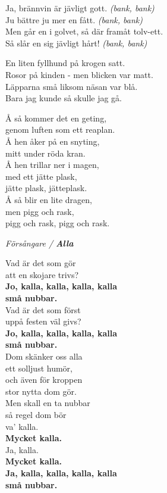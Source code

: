 \documentclass[a6paper,10pt]{article}
\begin{document}
\newpage
\setlength{\oddsidemargin}{-0.37in}
\noindent
Ja, brännvin är jävligt gott. \textit{(bank, bank)}\\
Ju bättre ju mer en fått. \textit{(bank, bank)}\\
Men går en i golvet, så där framåt tolv-ett. \\
Så slår en sig jävligt hårt! \textit{(bank, bank)}
\vspace{20pt}
\begin{center}
\end{center}
En liten fyllhund på krogen satt. \\
Rosor på kinden - men blicken var matt. \\
Läpparna små liksom näsan var blå. \\
Bara jag kunde så skulle jag gå. 
\vspace{20pt}
\begin{center}
\end{center}
Å så kommer det en geting, \\
genom luften som ett reaplan. \\
Å hen åker på en snyting, \\
mitt under röda kran. \\
Å hen trillar ner i magen, \\
med ett jätte plask, \\
jätte plask, jätteplask. \\
Å så blir en lite dragen, \\
men pigg och rask, \\
pigg och rask, pigg och rask. 

\newpage
\setlength{\oddsidemargin}{-0.47in}
\noindent
\begin{center}
\textit{Försångare / \textbf{Alla}}
\end{center}
Vad är det som gör \\
att en skojare trivs? \\
\textbf{Jo, kalla, kalla, kalla, kalla \\
små nubbar. \\}
Vad är det som först \\
uppå festen väl givs? \\
\textbf{Jo, kalla, kalla, kalla, kalla \\
små nubbar. \\}
Dom skänker oss alla \\
ett solljust humör, \\
och även för kroppen \\
stor nytta dom gör. \\
Men skall en ta nubbar \\
så regel dom bör \\
va' kalla. \\
\textbf{Mycket kalla.\\}
Ja, kalla. \\
\textbf{Mycket kalla.\\
Ja, kalla, kalla, kalla, kalla \\
små nubbar. }
\end{document}
